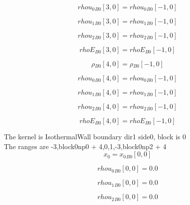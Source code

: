\documentclass{article}
\begin{document}
\begin{dmath}{rhou_{0}{_{B0}}}[{3,0}] = {rhou_{0}{_{B0}}}[{-1,0}]\end{dmath}

\begin{dmath}{rhou_{1}{_{B0}}}[{3,0}] = {rhou_{1}{_{B0}}}[{-1,0}]\end{dmath}

\begin{dmath}{rhou_{2}{_{B0}}}[{3,0}] = {rhou_{2}{_{B0}}}[{-1,0}]\end{dmath}

\begin{dmath}{rhoE{_{B0}}}[{3,0}] = {rhoE{_{B0}}}[{-1,0}]\end{dmath}

\begin{dmath}{\rho{_{B0}}}[{4,0}] = {\rho{_{B0}}}[{-1,0}]\end{dmath}

\begin{dmath}{rhou_{0}{_{B0}}}[{4,0}] = {rhou_{0}{_{B0}}}[{-1,0}]\end{dmath}

\begin{dmath}{rhou_{1}{_{B0}}}[{4,0}] = {rhou_{1}{_{B0}}}[{-1,0}]\end{dmath}

\begin{dmath}{rhou_{2}{_{B0}}}[{4,0}] = {rhou_{2}{_{B0}}}[{-1,0}]\end{dmath}

\begin{dmath}{rhoE{_{B0}}}[{4,0}] = {rhoE{_{B0}}}[{-1,0}]\end{dmath}

\noindent The kernel is IsothermalWall boundary dir1 side0, block is 0\\\noindent The ranges are -3,block0np0 + 4,0,1,-3,block0np2 + 4\\\begin{dmath}x_{0} = {x_{0}{_{B0}}}[{0,0}]\end{dmath}

\begin{dmath}{rhou_{0}{_{B0}}}[{0,0}] = 0.0\end{dmath}

\begin{dmath}{rhou_{1}{_{B0}}}[{0,0}] = 0.0\end{dmath}

\begin{dmath}{rhou_{2}{_{B0}}}[{0,0}] = 0.0\end{dmath}
\end{document}
